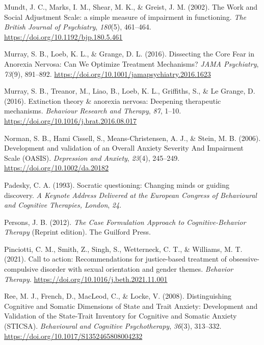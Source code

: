 \documentclass[
  man,floatsintext]{apa7}
\newlength{\cslhangindent}
\newlength{\cslentryspacingunit} %
\newenvironment{CSLReferences}[2] %
 {%
  \setlength{\parindent}{0pt}
  \ifodd #1
  \let\oldpar\par
  \def\par{\hangindent=\cslhangindent\oldpar}
  \fi
  \setlength{\parskip}{#2\cslentryspacingunit}
 }%
 {}
\begin{document}
\begin{CSLReferences}{1}{0}
\leavevmode{}%
Mundt, J. C., Marks, I. M., Shear, M. K., \& Greist, J. M. (2002). The Work and Social Adjustment Scale: a simple measure of impairment in functioning. \emph{The British Journal of Psychiatry}, \emph{180}(5), 461--464. \url{https://doi.org/10.1192/bjp.180.5.461}

\leavevmode{}%
Murray, S. B., Loeb, K. L., \& Grange, D. L. (2016). Dissecting the Core Fear in Anorexia Nervosa: Can We Optimize Treatment Mechanisms? \emph{JAMA Psychiatry}, \emph{73}(9), 891--892. \url{https://doi.org/10.1001/jamapsychiatry.2016.1623}

\leavevmode{}%
Murray, S. B., Treanor, M., Liao, B., Loeb, K. L., Griffiths, S., \& Le Grange, D. (2016). Extinction theory \& anorexia nervosa: Deepening therapeutic mechanisms. \emph{Behaviour Research and Therapy}, \emph{87}, 1--10. \url{https://doi.org/10.1016/j.brat.2016.08.017}

\leavevmode{}%
Norman, S. B., Hami Cissell, S., Means-Christensen, A. J., \& Stein, M. B. (2006). Development and validation of an Overall Anxiety Severity And Impairment Scale (OASIS). \emph{Depression and Anxiety}, \emph{23}(4), 245--249. \url{https://doi.org/10.1002/da.20182}

\leavevmode{}%
Padesky, C. A. (1993). Socratic questioning: Changing minds or guiding discovery. \emph{A Keynote Address Delivered at the European Congress of Behavioural and Cognitive Therapies, London}, \emph{24}.

\leavevmode{}%
Persons, J. B. (2012). \emph{The Case Formulation Approach to Cognitive-Behavior Therapy} (Reprint edition). The Guilford Press.

\leavevmode{}%
Pinciotti, C. M., Smith, Z., Singh, S., Wetterneck, C. T., \& Williams, M. T. (2021). Call to action: Recommendations for justice-based treatment of obsessive-compulsive disorder with sexual orientation and gender themes. \emph{Behavior Therapy}. \url{https://doi.org/10.1016/j.beth.2021.11.001}

\leavevmode{}%
Ree, M. J., French, D., MacLeod, C., \& Locke, V. (2008). Distinguishing Cognitive and Somatic Dimensions of State and Trait Anxiety: Development and Validation of the State-Trait Inventory for Cognitive and Somatic Anxiety (STICSA). \emph{Behavioural and Cognitive Psychotherapy}, \emph{36}(3), 313--332. \url{https://doi.org/10.1017/S1352465808004232}


\end{CSLReferences}
\end{document}
